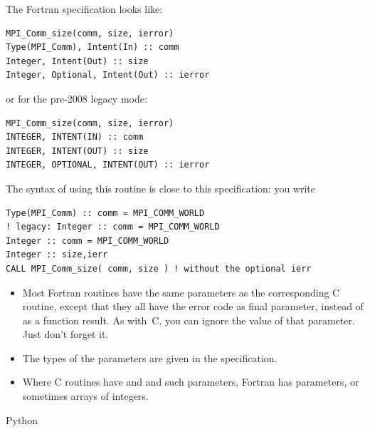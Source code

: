 The Fortran specification looks like:
\lstset{language=Fortran} %
\begin{lstlisting}
MPI_Comm_size(comm, size, ierror)
Type(MPI_Comm), Intent(In) :: comm
Integer, Intent(Out) :: size
Integer, Optional, Intent(Out) :: ierror
\end{lstlisting}
or for the pre-2008 legacy mode:
\begin{lstlisting}
MPI_Comm_size(comm, size, ierror)
INTEGER, INTENT(IN) :: comm
INTEGER, INTENT(OUT) :: size
INTEGER, OPTIONAL, INTENT(OUT) :: ierror
\end{lstlisting}
The syntax of using this routine is close to this specification: you
write
\begin{lstlisting}
Type(MPI_Comm) :: comm = MPI_COMM_WORLD
! legacy: Integer :: comm = MPI_COMM_WORLD
Integer :: comm = MPI_COMM_WORLD
Integer :: size,ierr
CALL MPI_Comm_size( comm, size ) ! without the optional ierr
\end{lstlisting}
\lstset{language=C} %

\begin{itemize}
\item Most Fortran routines have the same parameters as the
  corresponding C routine, except that they all have the error code as
  final parameter, instead of as a function result. As with~C, you can
  ignore the value of that parameter. Just don't forget it.
\item The types of the parameters are given in the specification.
\item Where C routines have  and  and such
  parameters, Fortran has  parameters, or sometimes arrays
  of integers.
\end{itemize}

 {Python}


